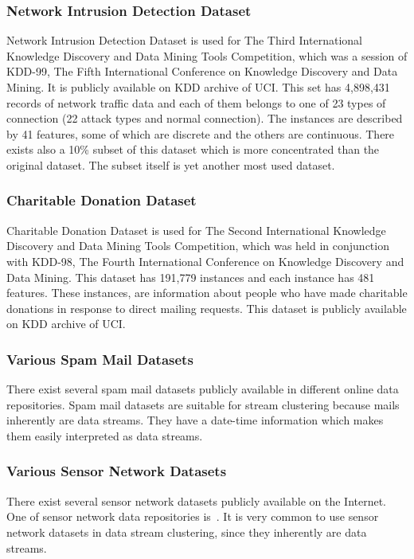 \documentclass[smallcondensed]{svjour3}     %
\begin{document}
\subsubsection{Network Intrusion Detection Dataset}
Network Intrusion Detection Dataset is used for The Third International Knowledge Discovery and Data Mining Tools Competition, which was a session of KDD-99, The Fifth International Conference on Knowledge Discovery and Data Mining. It is publicly available on KDD archive of UCI. This set has 4,898,431 records of network traffic data and each of them belongs to one of 23 types of connection (22 attack types and normal connection). The instances are described by 41 features, some of which are discrete and the others are continuous. There exists also a 10\% subset of this dataset which is more concentrated than the original dataset. The subset itself is yet another most used dataset.

\subsubsection{Charitable Donation Dataset}
Charitable Donation Dataset is used for The Second International Knowledge Discovery and Data Mining Tools Competition, which was held in conjunction with KDD-98, The Fourth International Conference on Knowledge Discovery and Data Mining. This dataset has 191,779 instances and each instance has 481 features. These instances, are information about people who have made charitable donations in response to direct mailing requests. This dataset is publicly available on KDD archive of UCI.

\subsubsection{Various Spam Mail Datasets}
There exist several spam mail datasets publicly available in different online data repositories. Spam mail datasets are suitable for stream clustering because mails inherently are data streams. They have a date-time information which makes them easily interpreted as data streams.

\subsubsection{Various Sensor Network Datasets}
There exist several sensor network datasets publicly available on the Internet. One of sensor network data repositories is~\citeauthor{rawdad}. It is very common to use sensor network datasets in data stream clustering, since they inherently are data streams. 
\end{document}
